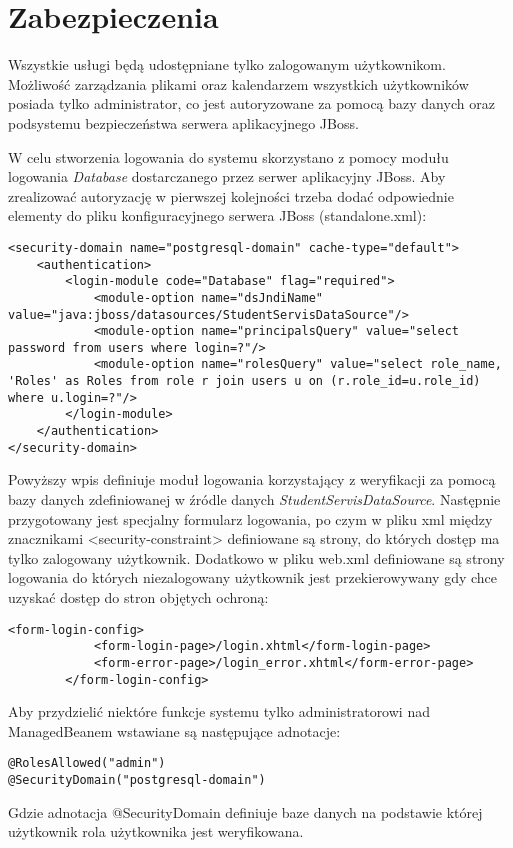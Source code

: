 \section{Zabezpieczenia}
Wszystkie usługi będą udostępniane tylko zalogowanym użytkownikom. Możliwość zarządzania plikami oraz kalendarzem wszystkich użytkowników posiada tylko administrator, co jest autoryzowane za pomocą bazy danych oraz podsystemu bezpieczeństwa serwera aplikacyjnego JBoss. 

W celu stworzenia logowania do systemu skorzystano z pomocy modułu logowania \textit{Database} dostarczanego przez serwer aplikacyjny JBoss. Aby zrealizować autoryzację w pierwszej kolejności trzeba dodać odpowiednie elementy do pliku konfiguracyjnego serwera JBoss (standalone.xml):
\begin{lstlisting}[breaklines=true]
<security-domain name="postgresql-domain" cache-type="default">
	<authentication>
		<login-module code="Database" flag="required">
			<module-option name="dsJndiName" value="java:jboss/datasources/StudentServisDataSource"/>
			<module-option name="principalsQuery" value="select password from users where login=?"/>
			<module-option name="rolesQuery" value="select role_name, 'Roles' as Roles from role r join users u on (r.role_id=u.role_id) where u.login=?"/>
		</login-module>
	</authentication>
</security-domain>
\end{lstlisting}
Powyższy wpis definiuje moduł logowania korzystający z weryfikacji za pomocą bazy danych zdefiniowanej w źródle danych \textit{StudentServisDataSource}. Następnie przygotowany jest specjalny formularz logowania, po czym w pliku xml między znacznikami <security-constraint> definiowane są strony, do których dostęp ma tylko zalogowany użytkownik. Dodatkowo w pliku web.xml definiowane są strony logowania do których niezalogowany użytkownik jest przekierowywany gdy chce uzyskać dostęp do stron objętych ochroną:
\begin{lstlisting}[breaklines=true]
		<form-login-config>
			<form-login-page>/login.xhtml</form-login-page>
			<form-error-page>/login_error.xhtml</form-error-page>
		</form-login-config>
\end{lstlisting}
Aby przydzielić niektóre funkcje systemu tylko administratorowi nad ManagedBeanem wstawiane są następujące adnotacje:
\begin{lstlisting}[breaklines=true]
@RolesAllowed("admin")
@SecurityDomain("postgresql-domain") 
\end{lstlisting} 
Gdzie adnotacja @SecurityDomain definiuje baze danych na podstawie której użytkownik rola użytkownika jest weryfikowana.
